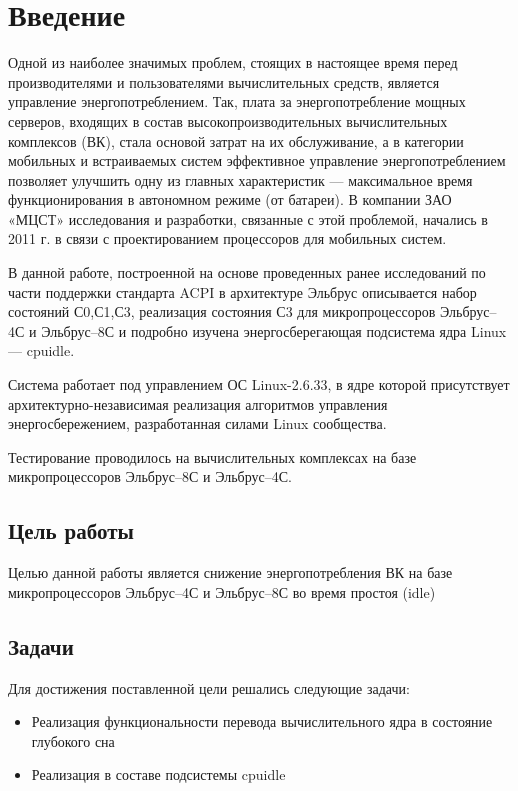 \documentclass{article}
\begin{document}


\tableofcontents
\setcounter{page}{2}
\newpage

\section{Введение}

Одной из наиболее значимых проблем, стоящих в настоящее время перед производителями и пользователями вычислительных средств, является управление энергопотреблением. Так, плата за энергопотребление мощных серверов, входящих в состав высокопроизводительных вычислительных комплексов (ВК), стала основой затрат на их обслуживание, а в категории мобильных и встраиваемых систем эффективное управление энергопотреблением позволяет улучшить одну из главных характеристик --- максимальное время функционирования в автономном режиме (от батареи). В компании ЗАО «МЦСТ» исследования и разработки, связанные с этой проблемой, начались в 2011 г. в связи с проектированием процессоров для мобильных систем.

В данной работе, построенной на основе проведенных ранее исследований по части
поддержки стандарта ACPI в архитектуре Эльбрус описывается набор состояний С0,С1,С3, реализация состояния С3 для микропроцессоров Эльбрус--4С и Эльбрус--8С и подробно изучена энергосберегающая подсистема ядра Linux --- cpuidle.

Система работает под управлением ОС Linux-2.6.33, в ядре которой присутствует
архитектурно-независимая реализация алгоритмов управления энергосбережением, разработанная силами Linux сообщества.

Тестирование проводилось на вычислительных комплексах на базе микропроцессоров Эльбрус--8С и Эльбрус--4С.

\subsection{Цель работы}
Целью данной работы является снижение энергопотребления ВК на базе микропроцессоров Эльбрус--4С и Эльбрус--8С во время простоя (idle)
\subsection{Задачи}
Для достижения поставленной цели решались следующие задачи:
\begin{itemize}
\item Реализация функциональности перевода вычислительного ядра в состояние глубокого сна
\item Реализация в составе подсистемы cpuidle
\end{itemize}
\end{document}
